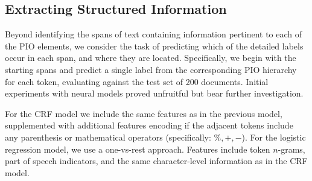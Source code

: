 \documentclass[11pt,a4paper]{article}
\begin{document}




\subsection{Extracting Structured Information}
\label{section:tasks-extraction}

Beyond identifying the spans of text containing information pertinent to each of the PIO elements, we consider the task of predicting which of the detailed labels occur in each span, and where they are located.
Specifically, we begin with the starting spans and predict a single label from the corresponding PIO hierarchy for each token, evaluating against the test set of 200 documents.
Initial experiments with neural models proved unfruitful but bear further investigation.

For the CRF model we include the same features as in the previous model, supplemented with additional features encoding if the adjacent tokens include any parenthesis or mathematical operators (specifically: $\%, +, -$).
For the logistic regression model, we use a one-vs-rest approach.
Features include token $n$-grams, part of speech indicators, and the same character-level information as in the CRF model. 
\end{document}
